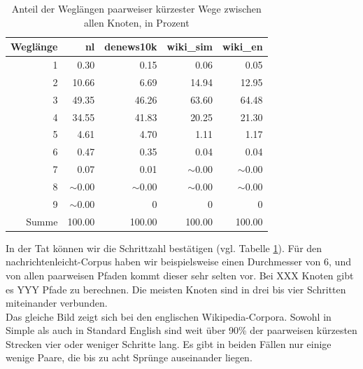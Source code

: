 \documentclass[11pt, a4paper]{article}
\begin{document}
\begin{table}[ht]
    \centering
    \begin{tabular}{rrrrr}
      \toprule
    Weglänge & nl & denews10k & wiki\_sim & wiki\_en \\ 
      \midrule
      1 & 0.30      & 0.15      & 0.06      & 0.05 \\ 
      2 & 10.66     & 6.69      & 14.94     & 12.95 \\ 
      3 & 49.35     & 46.26     & 63.60     & 64.48 \\ 
      4 & 34.55     & 41.83     & 20.25     & 21.30 \\ 
      5 & 4.61      & 4.70      & 1.11      & 1.17 \\ 
      6 & 0.47      & 0.35      & 0.04      & 0.04 \\ 
      7 & 0.07      & 0.01      & $\sim$0.00  & $\sim$0.00 \\ 
      8 & $\sim$0.00  & $\sim$0.00  & $\sim$0.00  & $\sim$0.00 \\ 
      9 & $\sim$0.00  & 0         & 0         & 0 \\ 
      Summe & 100.00  & 100.00    & 100.00    & 100.00 \\ 
       \bottomrule
    \end{tabular}
    \caption{Anteil der Weglängen paarweiser kürzester Wege zwischen allen Knoten, in Prozent}
    \label{md-perc}
\end{table}



In der Tat können wir die Schrittzahl bestätigen (vgl. Tabelle \ref{md-perc}).
Für den nachrichtenleicht-Corpus haben wir beispielsweise einen Durchmesser von
6, und von %
allen paarweisen Pfaden kommt dieser sehr selten vor. Bei XXX Knoten gibt
es YYY Pfade zu berechnen. Die meisten Knoten sind in drei bis vier Schritten
miteinander verbunden.\\
Das gleiche Bild zeigt sich bei den englischen Wikipedia-Corpora. Sowohl in 
Simple als auch in Standard English sind weit über 90\% der paarweisen
kürzesten Strecken vier oder weniger Schritte lang. Es gibt in beiden Fällen nur
einige wenige Paare, die bis zu acht Sprünge auseinander liegen.

\end{document}
